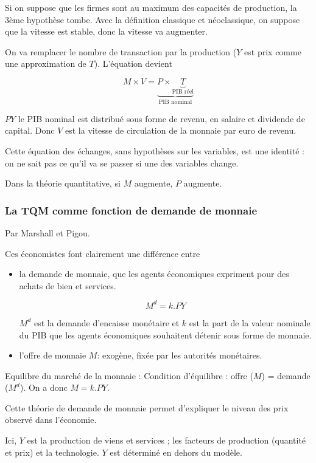 	Si on suppose que les firmes sont au maximum des capacités de production, la 3ème hypothèse tombe. Avec la définition classique et néoclassique, on suppose que la vitesse est stable, donc la vitesse va augmenter.
	
	On va remplacer le nombre de transaction par la production ($Y$ est prix comme une approximation de $T$). L'équation devient
	
	$$M \times V = \underbrace{P \times \underbrace{T}_{\text{PIB réel}}}_{\text{PIB nominal}}$$
	
	$PY$ le PIB nominal est distribué sous forme de revenu, en salaire et dividende de capital. Donc $V$ est la vitesse de circulation de la monnaie par euro de revenu.
	
	Cette équation des échanges, sans hypothèses sur les variables, est une identité : on ne sait pas ce qu'il va se passer si une des variables change.
	
	Dans la théorie quantitative, si $M$ augmente, $P$ augmente.
	
	
	\subsubsection{La TQM comme fonction de demande de monnaie}
	
	Par Marshall et Pigou.
	
	Ces économistes font clairement une différence entre
	
	\begin{itemize}
		\item la demande de monnaie, que les agents économiques expriment pour des achats de bien et services.
		
		$$M^d =k.PY$$
		
		$M^d$ est la demande d'encaisse monétaire et $k$ est la part de la valeur nominale du PIB que les agents économiques souhaitent détenir sous forme de monnaie.
		
		\item l'offre de monnaie $M$: exogène, fixée par les autorités monétaires.
	\end{itemize}
	
	Equilibre du marché de la monnaie : Condition d'équilibre : offre ($M$) = demande ($M^d$). On a donc $M = k.PY$.
	
	Cette théorie de demande de monnaie permet d'expliquer le niveau des prix observé dans l'économie.
	
	Ici, $Y$ est la production de viens et services ; les facteurs de production (quantité et prix) et la technologie. $Y$ est déterminé en dehors du modèle.
	
